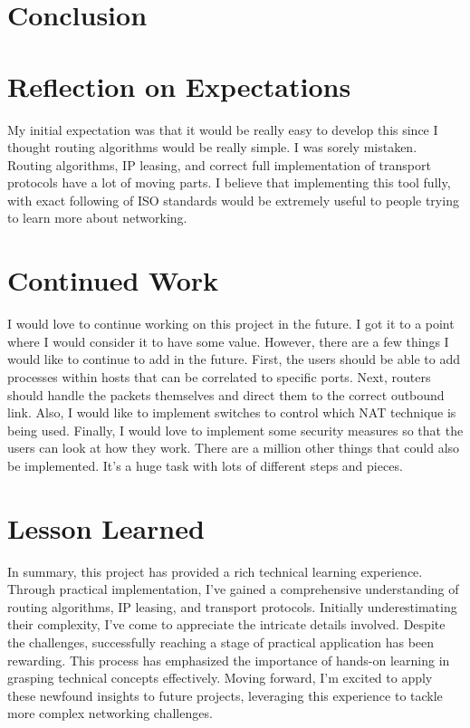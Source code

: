\documentclass{assignment-x}
\begin{document}
\section{Conclusion}
\section{Reflection on Expectations}
My initial expectation was that it would be really easy to develop this since I thought routing algorithms would be really simple. I was sorely mistaken. Routing algorithms, IP leasing, and correct full implementation of transport protocols have a lot of moving parts. I believe that implementing this tool fully, with exact following of ISO standards would be extremely useful to people trying to learn more about networking.

\section{Continued Work}
I would love to continue working on this project in the future. I got it to a point where I would consider it to have some value. However, there are a few things I would like to continue to add in the future. First, the users should be able to add processes within hosts that can be correlated to specific ports. Next, routers should handle the packets themselves and direct them to the correct outbound link. Also, I would like to implement switches to control which NAT technique is being used. Finally, I would love to implement some security measures so that the users can look at how they work. There are a million other things that could also be implemented. It's a huge task with lots of different steps and pieces.

\section{Lesson Learned}
In summary, this project has provided a rich technical learning experience. Through practical implementation, I've gained a comprehensive understanding of routing algorithms, IP leasing, and transport protocols. Initially underestimating their complexity, I've come to appreciate the intricate details involved. Despite the challenges, successfully reaching a stage of practical application has been rewarding. This process has emphasized the importance of hands-on learning in grasping technical concepts effectively. Moving forward, I'm excited to apply these newfound insights to future projects, leveraging this experience to tackle more complex networking challenges.

\pagebreak

\end{document}
